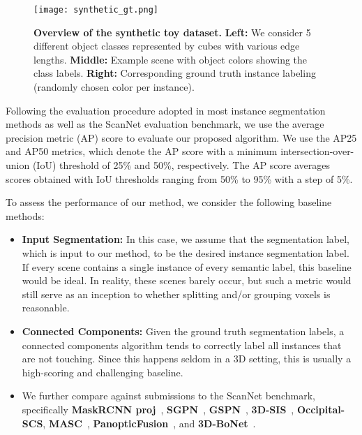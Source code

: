 \documentclass[10pt,twocolumn,letterpaper]{article}
\newcommand{\boldparagraph}[1]{\vspace{0.5em}\noindent{\bf #1} }
\begin{document}
\begin{figure}[tb]
	\centering
	\texttt{[image: synthetic\_gt.png]}
	\caption{\textbf{Overview of the synthetic toy dataset.}
	\textbf{Left:} We consider 5 different object classes represented by cubes with various edge lengths. 
	\textbf{Middle:} Example scene with object colors showing the class labels.
	\textbf{Right:} Corresponding ground truth instance labeling (randomly chosen color per instance).
	}
	\label{fig:synthetic_gt}
\end{figure}

\boldparagraph{Evaluation metrics.} Following the evaluation procedure adopted in most instance segmentation methods as well as the ScanNet evaluation benchmark, we use the average precision metric (AP) score to evaluate our proposed algorithm. 
We use the AP25 and AP50 metrics, which denote the AP score with a minimum intersection-over-union (IoU) threshold of 25\% and 50\%, respectively. 
The AP score averages scores obtained with IoU thresholds ranging from 50\% to 95\% with a step of 5\%.


\boldparagraph{Baselines.}
To assess the performance of our method, we consider the following baseline methods:
\begin{itemize}[topsep=2pt,leftmargin=*]
\setlength\itemsep{0mm}
\item \textbf{Input Segmentation:} In this case, we assume that the segmentation label, which is input to our method, to be the desired instance segmentation label. If every scene contains a single instance of every semantic label, this baseline would be ideal. In reality, these scenes barely occur, but such a metric would still serve as an inception to whether splitting and/or grouping voxels is reasonable.  
\item \textbf{Connected Components:} Given the ground truth segmentation labels, a connected components algorithm tends to correctly label all instances that are not touching. 
Since this happens seldom in a 3D setting, this is usually a high-scoring and challenging baseline.
\item We further compare against submissions to the ScanNet benchmark, specifically \textbf{MaskRCNN proj}~\cite{He-et-al-ICCV-2017}, \textbf{SGPN}~\cite{Qi-et-al-CVPR-2017}, \textbf{GSPN}~\cite{yi2018gspn}, \textbf{3D-SIS}~\cite{hou20183d}, \textbf{Occipital-SCS}, \textbf{MASC}~\cite{liu2019masc}, \textbf{PanopticFusion}~\cite{narita2019panopticfusion}, and \textbf{3D-BoNet}~\cite{yang2019learning}.
\end{itemize}
\end{document}
